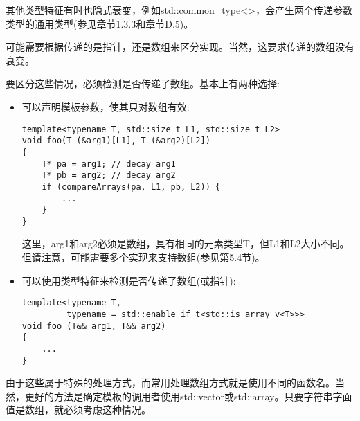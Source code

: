 其他类型特征有时也隐式衰变，例如std::common\_type<>，会产生两个传递参数类型的通用类型(参见章节1.3.3和章节D.5)。


可能需要根据传递的是指针，还是数组来区分实现。当然，这要求传递的数组没有衰变。

要区分这些情况，必须检测是否传递了数组。基本上有两种选择:

\begin{itemize}
\item 
可以声明模板参数，使其只对数组有效:

\begin{lstlisting}[style=styleCXX]
template<typename T, std::size_t L1, std::size_t L2>
void foo(T (&arg1)[L1], T (&arg2)[L2])
{
	T* pa = arg1; // decay arg1
	T* pb = arg2; // decay arg2
	if (compareArrays(pa, L1, pb, L2)) {
		...
	}
}
\end{lstlisting}

这里，arg1和arg2必须是数组，具有相同的元素类型T，但L1和L2大小不同。但请注意，可能需要多个实现来支持数组(参见第5.4节)。

\item 
可以使用类型特征来检测是否传递了数组(或指针):

\begin{lstlisting}[style=styleCXX]
template<typename T,
		 typename = std::enable_if_t<std::is_array_v<T>>>
void foo (T&& arg1, T&& arg2)
{
	...
}
\end{lstlisting}
\end{itemize}

由于这些属于特殊的处理方式，而常用处理数组方式就是使用不同的函数名。当然，更好的方法是确定模板的调用者使用std::vector或std::array。只要字符串字面值是数组，就必须考虑这种情况。


















